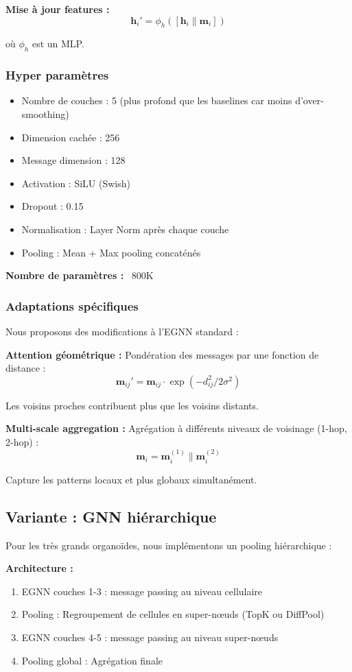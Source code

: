 \textbf{Mise à jour features :}
\[
\mathbf{h}_i' = \phi_h([\mathbf{h}_i \| \mathbf{m}_i])
\]

où $\phi_h$ est un MLP.

\subsubsection{Hyper paramètres}

\begin{itemize}
    \item Nombre de couches : 5 (plus profond que les baselines car moins d'over-smoothing)
    \item Dimension cachée : 256
    \item Message dimension : 128
    \item Activation : SiLU (Swish)
    \item Dropout : 0.15
    \item Normalisation : Layer Norm après chaque couche
    \item Pooling : Mean + Max pooling concaténés
\end{itemize}

\textbf{Nombre de paramètres :} ~800K

\subsubsection{Adaptations spécifiques}

Nous proposons des modifications à l'EGNN standard :

\textbf{Attention géométrique :}
Pondération des messages par une fonction de distance :
\[
\mathbf{m}_{ij}' = \mathbf{m}_{ij} \cdot \exp(-d_{ij}^2 / 2\sigma^2)
\]

Les voisins proches contribuent plus que les voisins distants.

\textbf{Multi-scale aggregation :}
Agrégation à différents niveaux de voisinage (1-hop, 2-hop) :
\[
\mathbf{m}_i = \mathbf{m}_i^{(1)} \| \mathbf{m}_i^{(2)}
\]

Capture les patterns locaux et plus globaux simultanément.

\subsection{Variante : GNN hiérarchique}

Pour les très grands organoïdes, nous implémentons un pooling hiérarchique :

\textbf{Architecture :}
\begin{enumerate}
    \item EGNN couches 1-3 : message passing au niveau cellulaire
    \item Pooling : Regroupement de cellules en super-nœuds (TopK ou DiffPool)
    \item EGNN couches 4-5 : message passing au niveau super-nœuds
    \item Pooling global : Agrégation finale
\end{enumerate}

